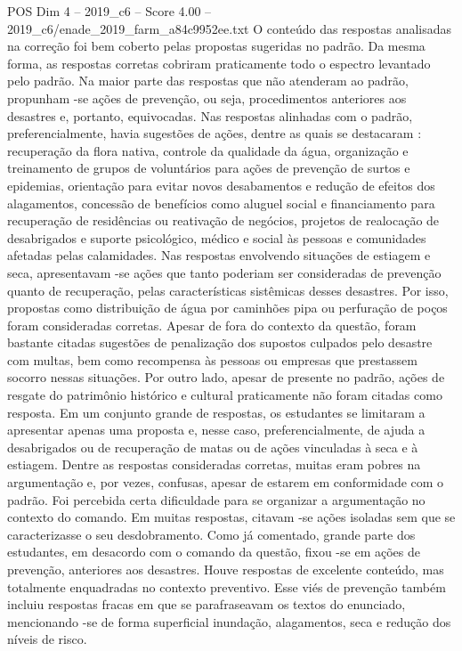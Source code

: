 \begin{textsample}{POS Dim 4 – 2019\_c6 – Score 4.00 – 2019\_c6/enade\_2019\_farm\_a84c9952ee.txt}
O conteúdo das respostas analisadas na correção foi bem coberto pelas propostas sugeridas no padrão.
Da mesma forma, as respostas corretas cobriram praticamente todo o espectro levantado pelo padrão.
Na maior parte das respostas que não atenderam ao padrão, propunham -se ações de prevenção, ou seja, procedimentos anteriores aos desastres e, portanto, equivocadas.
Nas respostas alinhadas com o padrão, preferencialmente, havia sugestões de ações, dentre as quais se destacaram : recuperação da flora nativa, controle da qualidade da água, organização e treinamento de grupos de voluntários para ações de prevenção de surtos e epidemias, orientação para evitar novos desabamentos e redução de efeitos dos alagamentos, concessão de benefícios como aluguel social e financiamento para recuperação de residências ou reativação de negócios, projetos de realocação de desabrigados e suporte psicológico, médico e social às pessoas e comunidades afetadas pelas calamidades.
Nas respostas envolvendo situações de estiagem e seca, apresentavam -se ações que tanto poderiam ser consideradas de prevenção quanto de recuperação, pelas características sistêmicas desses desastres.
Por isso, propostas como distribuição de água por caminhões pipa ou perfuração de poços foram consideradas corretas.
Apesar de fora do contexto da questão, foram bastante citadas sugestões de penalização dos supostos culpados pelo desastre com multas, bem como recompensa às pessoas ou empresas que prestassem socorro nessas situações.
Por outro lado, apesar de presente no padrão, ações de resgate do patrimônio histórico e cultural praticamente não foram citadas como resposta.
Em um conjunto grande de respostas, os estudantes se limitaram a apresentar apenas uma proposta e, nesse caso, preferencialmente, de ajuda a desabrigados ou de recuperação de matas ou de ações vinculadas à seca e à estiagem.
Dentre as respostas consideradas corretas, muitas eram pobres na argumentação e, por vezes, confusas, apesar de estarem em conformidade com o padrão.
Foi percebida certa dificuldade para se organizar a argumentação no contexto do comando.
Em muitas respostas, citavam -se ações isoladas sem que se caracterizasse o seu desdobramento.
Como já comentado, grande parte dos estudantes, em desacordo com o comando da questão, fixou -se em ações de prevenção, anteriores aos desastres.
Houve respostas de excelente conteúdo, mas totalmente enquadradas no contexto preventivo.
Esse viés de prevenção também incluiu respostas fracas em que se parafraseavam os textos do enunciado, mencionando -se de forma superficial inundação, alagamentos, seca e redução dos níveis de risco.

\end{textsample}
